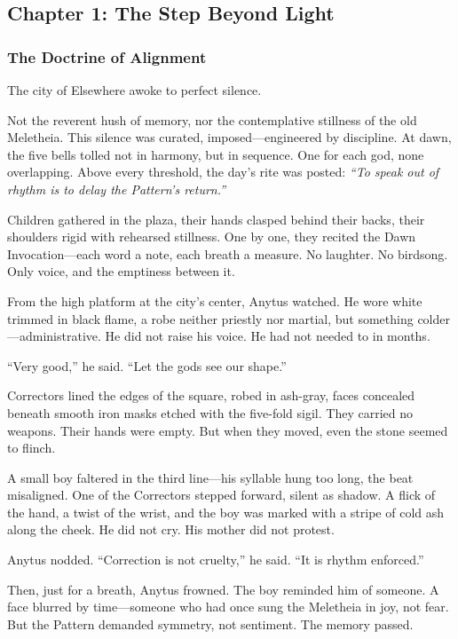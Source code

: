 \documentclass[12pt]{article}
\begin{document}
\newpage

\subsection*{Chapter 1: The Step Beyond Light}

\vspace{.5in}

\subsubsection*{The Doctrine of Alignment}

The city of Elsewhere awoke to perfect silence.

Not the reverent hush of memory, nor the contemplative stillness of the old Meletheia. This silence was curated, imposed—engineered by discipline. At dawn, the five bells tolled not in harmony, but in sequence. One for each god, none overlapping. Above every threshold, the day's rite was posted: \textit{“To speak out of rhythm is to delay the Pattern’s return.”}

Children gathered in the plaza, their hands clasped behind their backs, their shoulders rigid with rehearsed stillness. One by one, they recited the Dawn Invocation—each word a note, each breath a measure. No laughter. No birdsong. Only voice, and the emptiness between it.

From the high platform at the city’s center, Anytus watched. He wore white trimmed in black flame, a robe neither priestly nor martial, but something colder—administrative. He did not raise his voice. He had not needed to in months.

“Very good,” he said. “Let the gods see our shape.”

Correctors lined the edges of the square, robed in ash-gray, faces concealed beneath smooth iron masks etched with the five-fold sigil. They carried no weapons. Their hands were empty. But when they moved, even the stone seemed to flinch.

A small boy faltered in the third line—his syllable hung too long, the beat misaligned. One of the Correctors stepped forward, silent as shadow. A flick of the hand, a twist of the wrist, and the boy was marked with a stripe of cold ash along the cheek. He did not cry. His mother did not protest.

Anytus nodded. “Correction is not cruelty,” he said. “It is rhythm enforced.”

Then, just for a breath, Anytus frowned. The boy reminded him of someone. A face blurred by time—someone who had once sung the Meletheia in joy, not fear. But the Pattern demanded symmetry, not sentiment. The memory passed.
\end{document}
